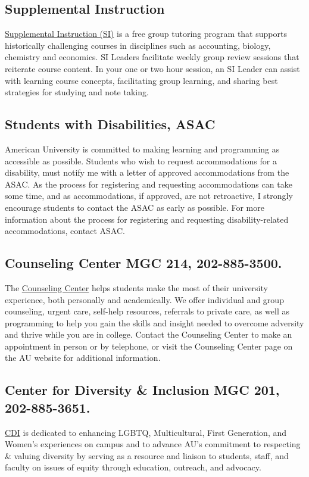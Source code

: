 \documentclass[10pt]{homework}
\begin{document}
\subsection{Supplemental Instruction} \href{https://www.american.edu/provost/academic-access/supplemental-instruction-homepage.cfm}{Supplemental Instruction (SI)} is a free group tutoring program that supports historically challenging courses in disciplines such as accounting, biology, chemistry and economics. SI Leaders facilitate weekly group review sessions that reiterate course content. In your one or two hour session, an SI Leader can assist with learning course concepts, facilitating group learning, and sharing best strategies for studying and note taking. 

\subsection{Students with Disabilities, ASAC} American University
is committed to making learning and programming as accessible as
possible. Students who wish to request accommodations for a
disability, must notify me with a letter of approved
accommodations from the ASAC. As the process for registering and
requesting accommodations can take some time, and as
accommodations, if approved, are not retroactive, I strongly
encourage students to contact the ASAC as early as possible. For
more information about the process for registering and requesting
disability-related accommodations, contact ASAC.

\subsection{Counseling Center MGC 214, 202-885-3500.} The
\href{http://www.american.edu/counseling}{Counseling Center} helps students make the most of their
university experience, both personally and academically. We offer
individual and group counseling, urgent care, self-help
resources, referrals to private care, as well as programming to
help you gain the skills and insight needed to overcome adversity
and thrive while you are in college. Contact the Counseling
Center to make an appointment in person or by telephone, or visit
the Counseling Center page on the AU website for additional
information.

\subsection{Center for Diversity \& Inclusion MGC 201,
202-885-3651.} \href{http://www.american.edu/ocl/cdi/}{CDI} is dedicated to enhancing LGBTQ,
Multicultural, First Generation, and Women's experiences on
campus and to advance AU's commitment to respecting \& valuing
diversity by serving as a resource and liaison to students,
staff, and faculty on issues of equity through education,
outreach, and advocacy.
\end{document}
